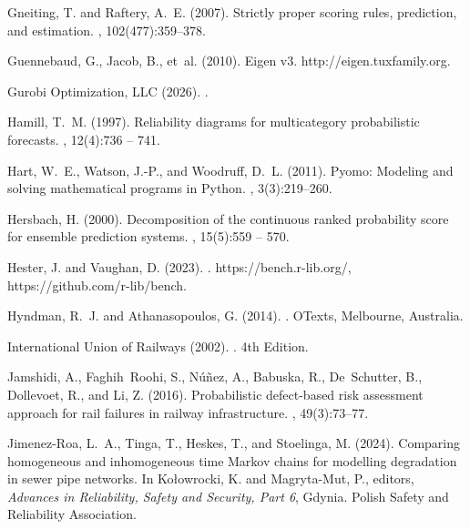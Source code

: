 \documentclass{article}
\begin{document}
\begin{thebibliography}{}
Gneiting, T. and Raftery, A.~E. (2007).
\newblock Strictly proper scoring rules, prediction, and estimation.
,
  102(477):359--378.

Guennebaud, G., Jacob, B., et~al. (2010).
\newblock Eigen v3.
\newblock http://eigen.tuxfamily.org.

{Gurobi Optimization, LLC} (2026).
.

Hamill, T.~M. (1997).
\newblock Reliability diagrams for multicategory probabilistic forecasts.
, 12(4):736 -- 741.

Hart, W.~E., Watson, J.-P., and Woodruff, D.~L. (2011).
\newblock Pyomo: {Modeling} and solving mathematical programs in {Python}.
, 3(3):219--260.

Hersbach, H. (2000).
\newblock Decomposition of the continuous ranked probability score for ensemble
  prediction systems.
, 15(5):559 -- 570.

Hester, J. and Vaughan, D. (2023).
.
\newblock https://bench.r-lib.org/, https://github.com/r-lib/bench.

Hyndman, R.~J. and Athanasopoulos, G. (2014).
.
\newblock OTexts, Melbourne, Australia.

{International Union of Railways} (2002).
.
\newblock 4th Edition.

Jamshidi, A., Faghih~Roohi, S., Núñez, A., Babuska, R., De~Schutter, B.,
  Dollevoet, R., and Li, Z. (2016).
\newblock Probabilistic defect-based risk assessment approach for rail failures
  in railway infrastructure.
, 49(3):73--77.

Jimenez-Roa, L.~A., Tinga, T., Heskes, T., and Stoelinga, M. (2024).
\newblock Comparing homogeneous and inhomogeneous time {Markov} chains for
  modelling degradation in sewer pipe networks.
\newblock In Ko{\l}owrocki, K. and Magryta-Mut, P., editors, {\em Advances in
  Reliability, Safety and Security, Part 6}, Gdynia. Polish Safety and
  Reliability Association.


\end{thebibliography}
\end{document}
